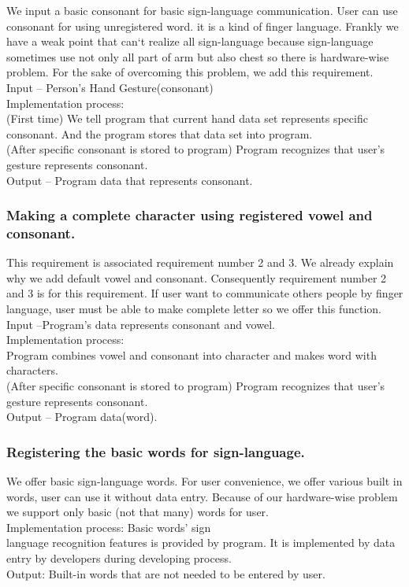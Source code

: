 \documentclass[10pt,journal,compsoc]{IEEEtran}
\begin{document}
We input a basic consonant for basic sign-language communication. User can use consonant for using unregistered word. it is a kind of finger language. Frankly we have a weak point that can`t realize all sign-language because sign-language sometimes use not only all part of arm but also chest so there is hardware-wise problem. For the sake of overcoming this problem, we add this requirement.
\\Input – Person's Hand Gesture(consonant)
\\Implementation process:
\\(First time) We tell program that current hand data set represents specific consonant. And the program stores that data set into program.
\\(After specific consonant is stored to program) Program recognizes that user’s gesture represents consonant.
\\Output – Program data that represents consonant.

\subsubsection{Making a complete character using registered vowel and consonant.}

This requirement is associated requirement number 2 and 3. We already explain why we add default vowel and consonant. Consequently requirement number 2 and 3 is for this requirement. If user want to communicate others people by finger language, user must be able to make complete letter so we offer this function.
\\Input –Program's data represents consonant and vowel.
\\Implementation process:
\\Program combines vowel and consonant into character and makes word with characters.
\\(After specific consonant is stored to program) Program recognizes that user’s gesture represents consonant.
\\Output – Program data(word).

\subsubsection{Registering the basic words for sign-language.}

We offer basic sign-language words. For user convenience, we offer various built in words, user can use it without data entry. Because of our hardware-wise problem we support only basic (not that many) words for user.
\\Implementation process:  Basic words’ sign 
\\language recognition features is provided by program. It is implemented by data entry by developers during developing process.
\\Output: Built-in words that are not needed to be entered by user.
\end{document}
